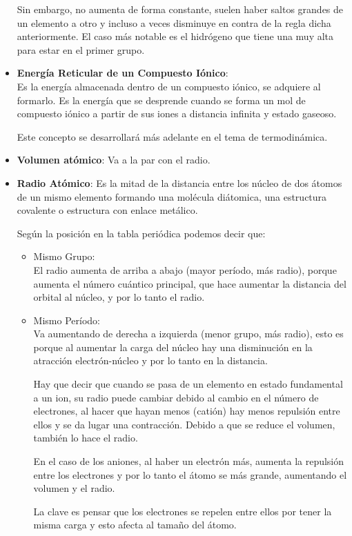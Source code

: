 \documentclass[arial,a4paper,print]{article}
\begin{document}
\begin{itemize}
Sin embargo, no aumenta de forma constante, suelen haber saltos grandes de un elemento a otro y incluso a veces disminuye en contra de la regla dicha anteriormente. El caso más notable es el hidrógeno que tiene una muy alta para estar en el primer grupo. 

\item \textbf{Energía Reticular de un Compuesto Iónico}:\\
Es la energía almacenada dentro de un compuesto iónico, se adquiere al formarlo. Es la energía que se desprende cuando se forma un mol de compuesto iónico a partir de sus iones a distancia infinita y estado gaseoso.

Este concepto se desarrollará más adelante en el tema de termodinámica. 

\item \textbf{Volumen atómico}:
Va a la par con el radio. 

\item \textbf{Radio Atómico}:
Es la mitad de la distancia entre los núcleo de dos átomos de un mismo elemento formando una molécula diátomica, una estructura covalente o estructura con enlace metálico. 

Según la posición en la tabla periódica podemos decir que:
\begin{itemize}
	
	\item Mismo Grupo:\\
	El radio aumenta de arriba a abajo (mayor período, más radio), porque aumenta el número cuántico principal, que hace aumentar la distancia del orbital al núcleo, y por lo tanto el radio. 
	
	\item Mismo Período:\\
	Va aumentando de derecha a izquierda (menor grupo, más radio), esto es porque al aumentar la carga del núcleo hay una disminución en la atracción electrón-núcleo y por lo tanto en la distancia. 
	
	Hay que decir que cuando se pasa de un elemento en estado fundamental a un ion, su radio puede cambiar debido al cambio en el número de electrones, al hacer que hayan menos (catión) hay menos repulsión entre ellos y se da lugar una contracción. Debido a que se reduce el volumen, también lo hace el radio. 
	
	En el caso de los aniones, al haber un electrón más, aumenta la repulsión entre los electrones y por lo tanto el átomo se más grande, aumentando el volumen y el radio. 
	
	La clave es pensar que los electrones se repelen entre ellos por tener la misma carga y esto afecta al tamaño del átomo. 
	
\end{itemize}


\end{itemize}
\end{document}
